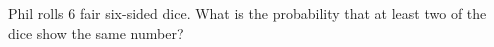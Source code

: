 Phil rolls $6$ fair six-sided dice. What is the probability that at least two of the dice show the same number?
